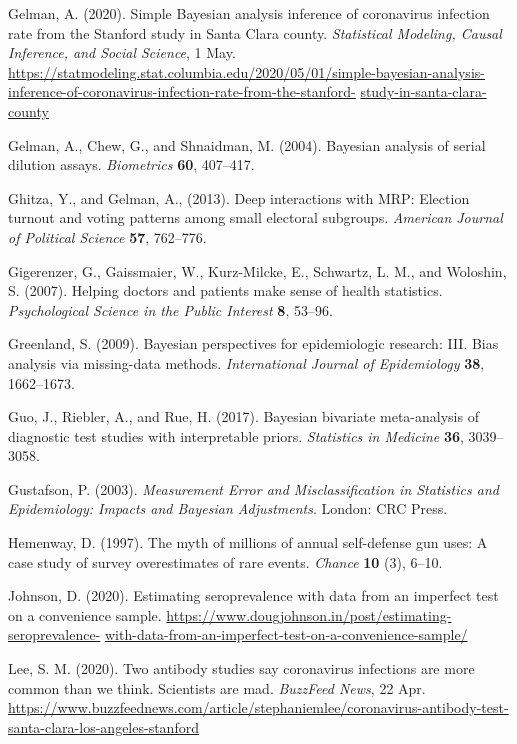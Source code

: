 \documentclass[11pt]{article}
\begin{document}
\bibitem Gelman, A. (2020).  Simple Bayesian analysis inference of
  coronavirus infection rate from the Stanford study in Santa Clara
  county. {\em Statistical Modeling, Causal Inference, and Social
    Science}, 1 May.  {\small
    \url{https://statmodeling.stat.columbia.edu/2020/05/01/simple-bayesian-analysis-inference-of-coronavirus-infection-rate-from-the-stanford-}} {\small \url{study-in-santa-clara-county}}

  
\bibitem Gelman, A., Chew, G., and Shnaidman, M. (2004).  Bayesian
  analysis of serial dilution assays. {\em Biometrics} {\bf 60},
  407--417.

\bibitem Ghitza, Y., and Gelman, A., (2013). Deep interactions with
  MRP: Election turnout and voting patterns among small electoral
  subgroups. {\em American Journal of Political Science} {\bf 57},
  762--776.

\bibitem Gigerenzer, G., Gaissmaier, W., Kurz-Milcke, E., Schwartz,
  L. M., and Woloshin, S.  (2007).  Helping doctors and patients make
  sense of health statistics.  {\em Psychological Science in the
    Public Interest} {\bf 8}, 53--96.

\bibitem Greenland, S. (2009).  Bayesian perspectives for
  epidemiologic research: III. Bias analysis via missing-data methods.
  {\em International Journal of Epidemiology} {\bf 38}, 1662--1673.

\bibitem Guo, J., Riebler, A., and Rue, H. (2017).  Bayesian bivariate
  meta-analysis of diagnostic test studies with interpretable priors.
  {\em Statistics in Medicine} {\bf 36}, 3039--3058.

\bibitem Gustafson, P. (2003).  {\em Measurement Error and
    Misclassification in Statistics and Epidemiology: Impacts and
    Bayesian Adjustments}.  London: CRC Press.

\bibitem Hemenway, D. (1997).  The myth of millions of annual
  self-defense gun uses: A case study of survey overestimates of rare
  events.  {\em Chance} {\bf 10} (3), 6--10.

\bibitem Johnson, D. (2020).  Estimating seroprevalence with data from
  an imperfect test on a convenience sample.  {\small
    \url{https://www.dougjohnson.in/post/estimating-seroprevalence-}} {\small \url{with-data-from-an-imperfect-test-on-a-convenience-sample/}}

\bibitem Lee, S. M. (2020).  Two antibody studies say coronavirus
  infections are more common than we think. Scientists are mad.  {\em
    BuzzFeed News}, 22 Apr.  {\small
    \url{https://www.buzzfeednews.com/article/stephaniemlee/coronavirus-antibody-test-santa-clara-los-angeles-stanford}}
\end{document}
